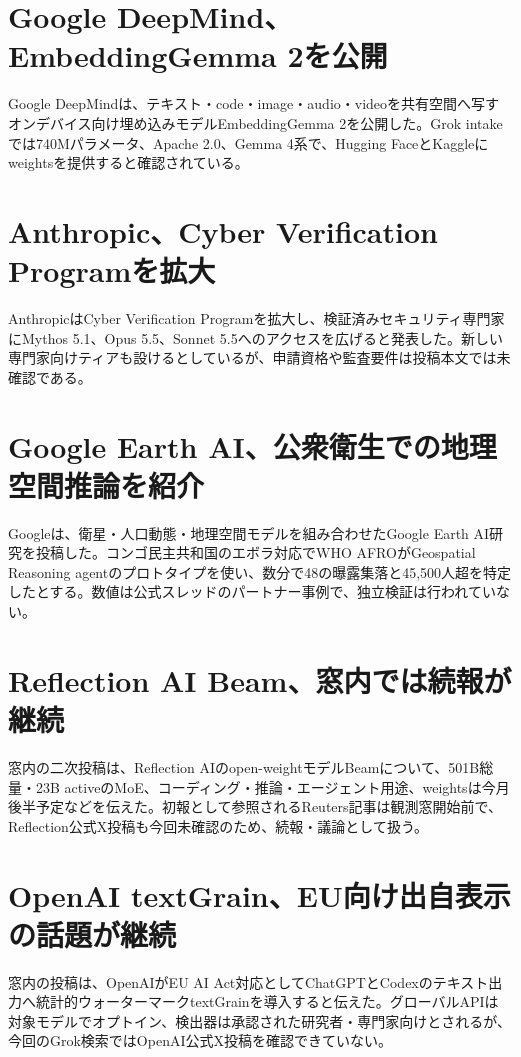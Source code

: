 \section{Google DeepMind、EmbeddingGemma 2を公開}
Google DeepMindは、テキスト・code・image・audio・videoを共有空間へ写すオンデバイス向け埋め込みモデルEmbeddingGemma 2を公開した。Grok intakeでは740Mパラメータ、Apache 2.0、Gemma 4系で、Hugging FaceとKaggleにweightsを提供すると確認されている。

\section{Anthropic、Cyber Verification Programを拡大}
AnthropicはCyber Verification Programを拡大し、検証済みセキュリティ専門家にMythos 5.1、Opus 5.5、Sonnet 5.5へのアクセスを広げると発表した。新しい専門家向けティアも設けるとしているが、申請資格や監査要件は投稿本文では未確認である。

\section{Google Earth AI、公衆衛生での地理空間推論を紹介}
Googleは、衛星・人口動態・地理空間モデルを組み合わせたGoogle Earth AI研究を投稿した。コンゴ民主共和国のエボラ対応でWHO AFROがGeospatial Reasoning agentのプロトタイプを使い、数分で48の曝露集落と45,500人超を特定したとする。数値は公式スレッドのパートナー事例で、独立検証は行われていない。

\section{Reflection AI Beam、窓内では続報が継続}
窓内の二次投稿は、Reflection AIのopen-weightモデルBeamについて、501B総量・23B activeのMoE、コーディング・推論・エージェント用途、weightsは今月後半予定などを伝えた。初報として参照されるReuters記事は観測窓開始前で、Reflection公式X投稿も今回未確認のため、続報・議論として扱う。

\section{OpenAI textGrain、EU向け出自表示の話題が継続}
窓内の投稿は、OpenAIがEU AI Act対応としてChatGPTとCodexのテキスト出力へ統計的ウォーターマークtextGrainを導入すると伝えた。グローバルAPIは対象モデルでオプトイン、検出器は承認された研究者・専門家向けとされるが、今回のGrok検索ではOpenAI公式X投稿を確認できていない。

